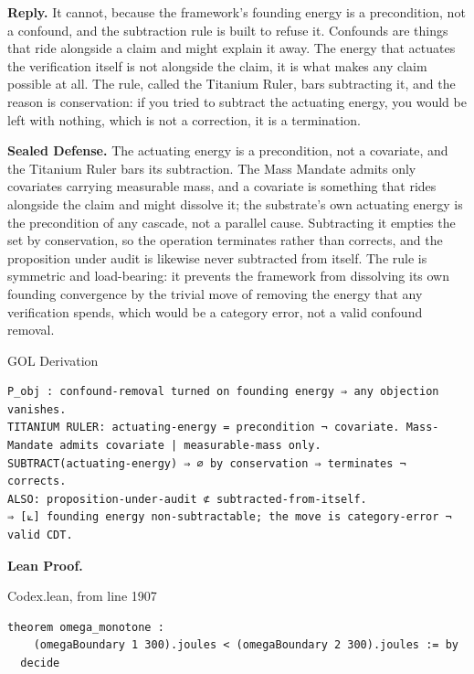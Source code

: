\documentclass[10pt,twocolumn]{article}
\begin{document}
\textbf{Reply.} It cannot, because the framework's founding energy is a
precondition, not a confound, and the subtraction rule is built to
refuse it. Confounds are things that ride alongside a claim and might
explain it away. The energy that actuates the verification itself is not
alongside the claim, it is what makes any claim possible at all. The
rule, called the Titanium Ruler, bars subtracting it, and the reason is
conservation: if you tried to subtract the actuating energy, you would
be left with nothing, which is not a correction, it is a termination.

\textbf{Sealed Defense.} The actuating energy is a precondition, not a
covariate, and the Titanium Ruler bars its subtraction. The Mass Mandate
admits only covariates carrying measurable mass, and a covariate is
something that rides alongside the claim and might dissolve it; the
substrate's own actuating energy is the precondition of any cascade, not
a parallel cause. Subtracting it empties the set by conservation, so the
operation terminates rather than corrects, and the proposition under
audit is likewise never subtracted from itself. The rule is symmetric
and load-bearing: it prevents the framework from dissolving its own
founding convergence by the trivial move of removing the energy that any
verification spends, which would be a category error, not a valid
confound removal.

\begin{golbox}{GOL Derivation}
\begin{lstlisting}[style=golv]
P_obj : confound-removal turned on founding energy ⇒ any objection vanishes.
TITANIUM RULER: actuating-energy = precondition ¬ covariate. Mass-Mandate admits covariate | measurable-mass only.
SUBTRACT(actuating-energy) ⇒ ∅ by conservation ⇒ terminates ¬ corrects.
ALSO: proposition-under-audit ⊄ subtracted-from-itself.
⇒ [⟀] founding energy non-subtractable; the move is category-error ¬ valid CDT.
\end{lstlisting}
\end{golbox}

\textbf{Lean Proof.}

\begin{leanexcerpt}{Codex.lean, from line 1907}
\begin{lstlisting}[style=leanx,firstnumber=1907]
theorem omega_monotone :
    (omegaBoundary 1 300).joules < (omegaBoundary 2 300).joules := by
  decide
\end{lstlisting}
\end{leanexcerpt}
\end{document}
